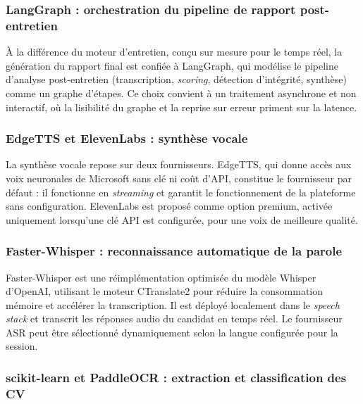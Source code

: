 \subsubsection{LangGraph : orchestration du pipeline de rapport post-entretien}


À la différence du moteur d'entretien, conçu sur mesure pour le temps réel, la génération du rapport final est confiée à LangGraph, qui modélise le pipeline d'analyse post-entretien (transcription, \textit{scoring}, détection d'intégrité, synthèse) comme un graphe d'étapes. Ce choix convient à un traitement asynchrone et non interactif, où la lisibilité du graphe et la reprise sur erreur priment sur la latence.

\subsubsection{EdgeTTS et ElevenLabs : synthèse vocale}

La synthèse vocale repose sur deux fournisseurs. EdgeTTS, qui donne accès aux voix neuronales de Microsoft sans clé ni coût d'API, constitue le fournisseur par défaut : il fonctionne en \textit{streaming} et garantit le fonctionnement de la plateforme sans configuration. ElevenLabs est proposé comme option premium, activée uniquement lorsqu'une clé API est configurée, pour une voix de meilleure qualité.


\subsubsection{Faster-Whisper : reconnaissance automatique de la parole}

Faster-Whisper est une réimplémentation optimisée du modèle Whisper d'OpenAI, utilisant le moteur CTranslate2 pour réduire la consommation mémoire et accélérer la transcription. Il est déployé localement dans le \textit{speech stack} et transcrit les réponses audio du candidat en temps réel. Le fournisseur ASR peut être sélectionné dynamiquement selon la langue configurée pour la session.


\subsubsection{scikit-learn et PaddleOCR : extraction et classification des CV}


